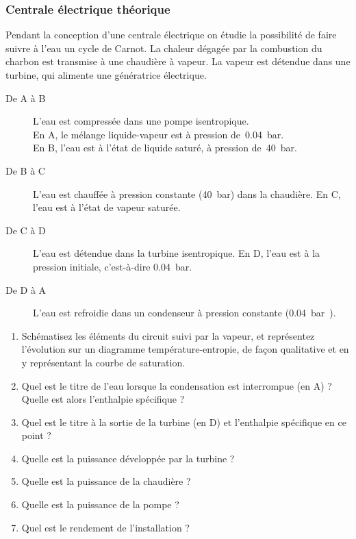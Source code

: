 \subsubsection{Centrale électrique théorique}
	
	Pendant la conception d’une centrale électrique on étudie la possibilité de faire suivre à l’eau un cycle de Carnot. La chaleur dégagée par la combustion du charbon est transmise à une chaudière à vapeur. La vapeur est détendue dans une turbine, qui alimente une génératrice électrique. 

	\begin{description}
		\item[De A à B] L’eau est compressée dans une pompe isentropique.\\
			En A, le mélange liquide-vapeur est à pression de~\SI{0,04}{\bar}.\\
			En B, l’eau est à l’état de liquide saturé, à pression de~\SI{40}{\bar}.
		\item[De B à C] L’eau est chauffée à pression constante (\SI{40}{\bar}) dans la chaudière. 
			En C, l’eau est à l’état de vapeur saturée.
		\item[De C à D] L’eau est détendue dans la turbine isentropique. 
			En D, l’eau est à la pression initiale, c’est-à-dire \SI{0,04}{\bar}.
		\item[De D à A] L’eau est refroidie dans un condenseur à pression constante (\SI{0,04} bar).
	\end{description}

\begin{enumerate}
	\item Schématisez les éléments du circuit suivi par la vapeur, et représentez l’évolution sur un diagramme température-entropie, de façon qualitative et en y représentant la courbe de saturation.
	\item Quel est le titre de l’eau lorsque la condensation est interrompue (en A) ? Quelle est alors l’enthalpie spécifique ?
	\item Quel est le titre à la sortie de la turbine (en D) et l’enthalpie spécifique en ce point ?
	\item Quelle est la puissance développée par la turbine ?
	\item Quelle est la puissance de la chaudière ?
	\item Quelle est la puissance de la pompe ?
	\item Quel est le rendement de l’installation ?
\end{enumerate}

